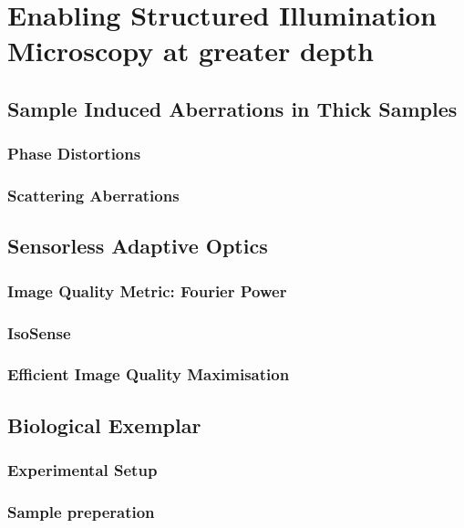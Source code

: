 \chapter{Enabling Structured Illumination Microscopy at greater depth}

\section{Sample Induced Aberrations in Thick Samples}
\label{sec:sample_aberrations_thick}

\subsection{Phase Distortions}
\label{subsec:phase_distortions}

\subsection{Scattering Aberrations}
\label{subsec:scattering}

\section{Sensorless Adaptive Optics}
\label{sec:sensorless_AO}

\subsection{Image Quality Metric: Fourier Power}
\label{subsec:fourier_power_metric}

\subsection{IsoSense}
\label{subsec:isosense}

\subsection{Efficient Image Quality Maximisation}
\label{subsec:efficient_correction}

\section{Biological Exemplar}
\label{sec:SIM_biology}

\subsection{Experimental Setup}
\label{subsec:SIM_setup}

\subsection{Sample preperation}
\label{subsec:SIM_sample_prep}